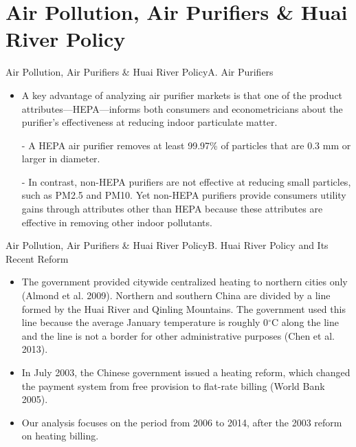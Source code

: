 \documentclass{beamer}
\begin{document}
\section{Air Pollution, Air Purifiers \& Huai River Policy}
\begin{frame}[shrink]
	\transfade %
	\tableofcontents[sectionstyle=show/shaded,subsectionstyle=show/shaded/hide]
	\addtocounter{framenumber}{-1}
\end{frame}
\begin{frame}{Air Pollution, Air Purifiers \& Huai River Policy}{A. Air Purifiers}
	\begin{itemize}
		\item A key advantage of analyzing air purifier markets is that one of the product attributes—HEPA—informs both consumers and econometricians about the purifier’s effectiveness at reducing indoor particulate matter.
		\item [-] A HEPA air purifier removes at least 99.97\% of particles that are 0.3 mm or larger in diameter.
		\item [-] In contrast, non-HEPA purifiers are not effective at reducing small particles, such as PM2.5 and PM10. Yet non-HEPA purifiers provide consumers utility gains through attributes other than HEPA because these attributes are effective in removing other indoor pollutants.
	\end{itemize}
\end{frame}
\begin{frame}{Air Pollution, Air Purifiers \& Huai River Policy}{B. Huai River Policy and Its Recent Reform}
	\begin{itemize}
		\item The government provided citywide centralized heating to northern cities only (Almond et al. 2009). Northern and southern China are divided by a line formed by the Huai River and Qinling Mountains. The government used this line because the average January temperature is roughly 0$^\circ$C along the line and the line is not a border for other administrative purposes (Chen et al. 2013).
		\item In July 2003, the Chinese government issued a heating reform, which changed the payment system from free provision to flat-rate billing (World Bank 2005).
		\item Our analysis focuses on the period from 2006 to 2014, after the 2003 reform on heating billing.
	\end{itemize}
\end{frame}
\end{document}
